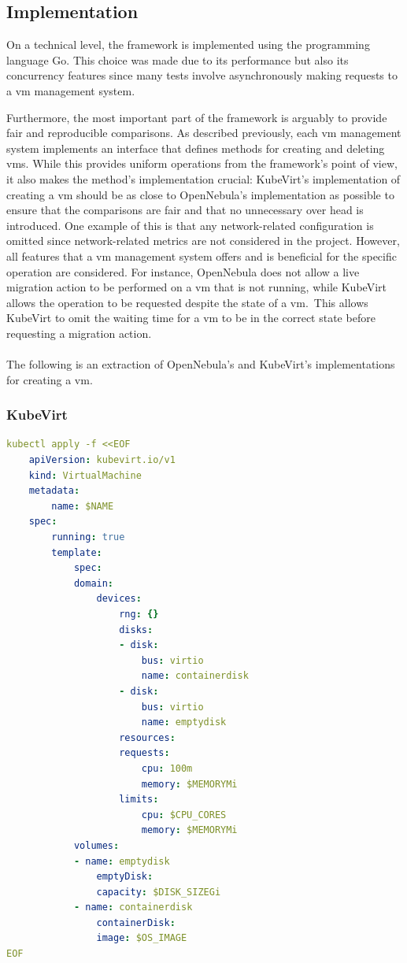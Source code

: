 \documentclass{kththesis}
\begin{document}
\subsection{Implementation}
On a technical level, the framework is implemented using the programming language Go. This choice was made due to its performance but also its concurrency features since many tests involve asynchronously making requests to a \Gls{vm} management system. 

Furthermore, the most important part of the framework is arguably to provide fair and reproducible comparisons. As described previously, each \Gls{vm} management system implements an interface that defines methods for creating and deleting \Glspl{vm}. While this provides uniform operations from the framework's point of view, it also makes the method's implementation crucial: KubeVirt's implementation of creating a \Gls{vm} should be as close to OpenNebula's implementation as possible to ensure that the comparisons are fair and that no unnecessary over head is introduced. One example of this is that any network-related configuration is omitted since network-related metrics are not considered in the project. However, all features that a \Gls{vm} management system offers and is beneficial for the specific operation are considered. For instance, OpenNebula does not allow a live migration action to be performed on a \Gls{vm} that is not running, while KubeVirt allows the operation to be requested despite the state of a \Gls{vm}.\ This allows KubeVirt to omit the waiting time for a \Gls{vm} to be in the correct state before requesting a migration action. 
\\~\\
\noindent The following is an extraction of OpenNebula's and KubeVirt's implementations for creating a \Gls{vm}.

\newpage 
\subsubsection*{KubeVirt}
\begin{lstlisting}[language=yaml]
kubectl apply -f <<EOF
    apiVersion: kubevirt.io/v1
    kind: VirtualMachine
    metadata:
        name: $NAME
    spec:
        running: true
        template:
            spec:
            domain:
                devices:
                    rng: {}
                    disks:
                    - disk:
                        bus: virtio
                        name: containerdisk
                    - disk:
                        bus: virtio
                        name: emptydisk
                    resources:
                    requests:
                        cpu: 100m
                        memory: $MEMORYMi
                    limits:
                        cpu: $CPU_CORES
                        memory: $MEMORYMi
            volumes:
            - name: emptydisk
                emptyDisk:
                capacity: $DISK_SIZEGi
            - name: containerdisk
                containerDisk:
                image: $OS_IMAGE
EOF
\end{lstlisting}
\end{document}
